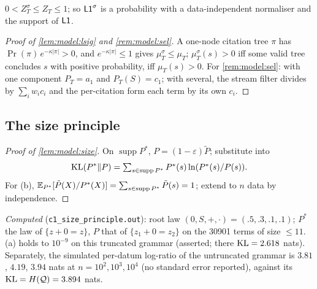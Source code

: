 \begin{lemma}\label{lem:model:lsig}
$0<Z^\sigma_T\le Z_T\le1$; so $\mathord{\mathsf{L1}}^{\sigma}$ is a probability with a data-independent normaliser and the support of $\mathord{\mathsf{L1}}$.
\end{lemma}

\begin{proof}[Proof of \cref{lem:model:lsig} and \cref{rem:model:sel}]
A one-node citation tree $\pi$ has $\Pr(\pi)\,e^{-\kappa|\pi|}>0$, and $e^{-\kappa|\pi|}\le1$ gives $\mu^\sigma_T\le\mu_T$; $\mu^\sigma_T(s)>0$ iff some valid tree concludes $s$ with positive probability, iff $\mu_T(s)>0$. For \cref{rem:model:sel}: with one component $P_T=a_1$ and $P_T(S)=c_1$; with several, the stream filter divides by $\sum_iw_ic_i$ and the per-citation form each term by its own $c_i$.
\end{proof}

\subsection{The size principle}\label{app:model:size}

\begin{proof}[Proof of \cref{lem:model:size}]
On $\operatorname{supp}P^*$, $P=(1-\varepsilon)\tilde P$; substitute into
\[\mathrm{KL}(P^*\|P)=\textstyle\sum_{s\in\operatorname{supp}P^*}P^*(s)\ln(P^*(s)/P(s)).\] For (b), $\mathbb{E}_{P^*}[\tilde P(X)/P^*(X)]=\sum_{s\in\operatorname{supp}P^*}\tilde P(s)=1$; extend to $n$ data by independence.
\end{proof}

\emph{Computed} (\texttt{c1\_size\_principle.out}): root law $(0,S,+,\cdot)=(.5,.3,.1,.1)$; $P^*$ the law of $\{z+0=z\}$, $P$ that of $\{z_1+0=z_2\}$ on the 30901 terms of size $\le11$. (a) holds to $10^{-9}$ on this truncated grammar (asserted; there $\mathrm{KL}=2.618$ nats). Separately, the simulated per-datum log-ratio of the untruncated grammar is $3.81$, $4.19$, $3.94$ nats at $n=10^2,10^3,10^4$ (no standard error reported), against its $\mathrm{KL}=H(\mathcal{Q})=3.894$ nats.

